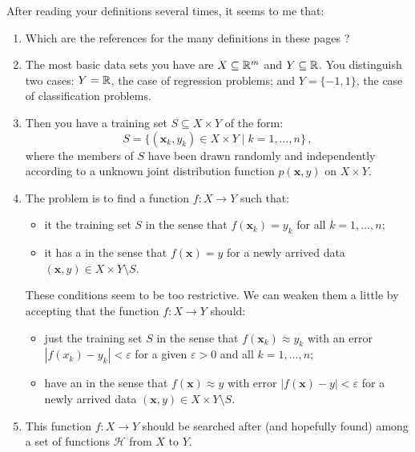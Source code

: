 \begin{description}[style=unboxed,leftmargin=0cm,itemsep=3ex]

\mbox{}\newline
After reading your definitions several times, it seems to me that:

\begin{enumerate}

\item
Which are the references for the many definitions in these pages ?

\item
The most basic data sets you have are $X\subseteq{\mathbb R }^m$ and $Y\subseteq{\mathbb R }$.
You distinguish two cases: $Y={\mathbb R }$, the case of regression problems;
and $Y=\{-1,1\}$, the case of classification problems.

\item
Then you have a training set $S\subseteq X\times Y$ of the form:
$$
S=\big\{ (\mathbf{x}_k,y_k)\in X\times Y \mid k=1,\dots,n \big\}\,,
$$
where the members of $S$ have been drawn randomly and independently
according to a unknown joint distribution function
$p(\mathbf{x},y)$ on $X\times Y$.

\item
The problem is to find a function $f:X\to Y$ such that:
\begin{itemize}
\item
it  the training set $S$ in the sense that
$f(\mathbf{x}_k)=y_k$ for all $k=1,\dots,n$; \\

\item
it has a  in the sense that $f(\mathbf{x})=y$
for a newly arrived data $(\mathbf{x},y)\in X\times Y\setminus S$.
\end{itemize}
These conditions seem to be too restrictive.
We can weaken them a little by accepting that the function $f:X\to Y$ should:
\begin{itemize}
\item
just  the training set $S$ in the sense that
$f(\mathbf{x}_k)\approx y_k$ with an error $|f(x_k)-y_k|<\varepsilon$ for
a given $\varepsilon>0$ and all $k=1,\dots,n$; \\
\item
have an  in the sense that
$f(\mathbf{x})\approx y$ with error $|f(\mathbf{x})-y|<\varepsilon$
for a newly arrived data $(\mathbf{x},y)\in X\times Y\setminus S$.
\end{itemize}
\item 
This function $f:X\to Y$ should be searched after (and hopefully found)
among a set of functions $\mathscr{H}$ from $X$ to $Y$.


\end{enumerate}
\end{description}
